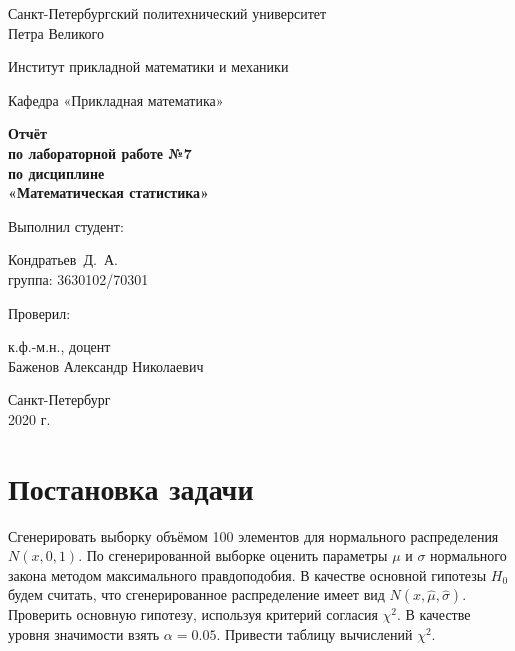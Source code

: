 \documentclass[12pt,a4paper]{article}
\begin{document}
	\begin{titlepage}
		\begin{center}			
			Санкт-Петербургский политехнический университет\\
			Петра Великого
			\vspace{0.25cm}
			
			Институт прикладной математики и механики
			
			Кафедра «Прикладная математика»
			\vfill
			
			\textbf{Отчёт\\
				по лабораторной работе №7\\
				по дисциплине\\
				«Математическая статистика»}\\[5mm]
			\bigskip
		\end{center}
		\vfill
		
		\hfill\begin{minipage}{0.45\textwidth}
			Выполнил студент:
			\vspace{0.2cm}
			
			Кондратьев~Д.~А.\\
			группа: 3630102/70301
		\end{minipage}%
		\bigskip
		
		\hfill\begin{minipage}{0.45\textwidth}
			Проверил:
			\vspace{0.2cm}
			
			к.ф.-м.н., доцент\\
			Баженов Александр Николаевич
		\end{minipage}%
		\vfill
		
		\begin{center}
			Санкт-Петербург\\
			2020 г.
		\end{center}
	\end{titlepage}
	
	
	
	\tableofcontents{}
	\listoftables
	
	\newpage
	\section{Постановка задачи}
	Сгенерировать выборку объёмом 100 элементов для нормального распределения $N(x, 0, 1)$. По сгенерированной выборке оценить параметры $\mu$ и $\sigma$ нормального закона методом максимального правдоподобия. В качестве основной гипотезы $H_0$ будем считать, что сгенерированное распределение имеет вид $N(x, \hat{\mu}, \hat{\sigma})$. Проверить основную гипотезу, используя критерий согласия $\chi^2$. В качестве уровня значимости взять $\alpha = 0.05$. Привести таблицу вычислений $\chi^2$.
	
\end{document}
